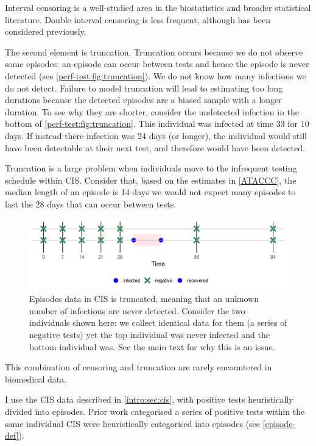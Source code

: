 \documentclass[thesis.tex]{subfiles}
\begin{document}
Interval censoring is a well-studied area in the biostatistics and broader statistical literature.
Double interval censoring is less frequent, although has been considered previously.

The second element is truncation.
Truncation occurs because we do not observe some episodes: an episode can occur between tests and hence the episode is never detected (see \autoref{perf-test:fig:truncation}).
We do not know how many infections we do not detect.
Failure to model truncation will lead to estimating too long durations because the detected episodes are a biased sample with a longer duration.
To see why they are shorter, consider the undetected infection in the bottom of \autoref{perf-test:fig:truncation}.
This individual was infected at time 33 for 10 days.
If instead there infection was 24 days (or longer), the individual would still have been detectable at their next test, and therefore would have been detected.

Truncation is a large problem when individuals move to the infrequent testing schedule within CIS.
Consider that, based on the estimates in \autoref{ATACCC}, the median length of an episode is 14 days  we would not expect many episodes to last the 28 days that can occur between tests.
\begin{figure}
  \centering \includegraphics{cis-perfect-testing/truncation}
  \caption{Episodes data in CIS is truncated, meaning that an unknown number of infections are never detected. Consider the two individuals shown here: we collect identical data for them (a series of negative tests) yet the top individual was never infected and the bottom individual was. See the main text for why this is an issue. \label{perf-test:fig:truncation}}
\end{figure}

This combination of censoring and truncation are rarely encountered in biomedical data. 

I use the CIS data described in \autoref{intro:sec:cis}, with positive tests heuristically divided into episodes.
Prior work categorised a series of positive tests within the same individual CIS were heuristically categorised into episodes (see \autoref{episode-def}).
\end{document}
